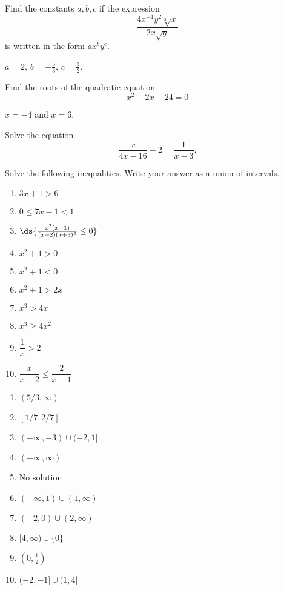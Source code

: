 \begin{enumialphparenastyle}
\begin{multicols}{2}
\begin{ex}
Find the constants $a,b,c$ if the expression
$$\frac{4x^{-1}y^2\sqrt[3]{x}}{2x\sqrt{y}}$$
is written in the form $ax^by^c$.
\begin{sol}
	$a=2$, $b=-\frac{5}{3}$, $c=\frac{3}{2}$. 
\end{sol}
\end{ex}

\begin{ex}
Find the roots of the quadratic equation
$$x^2-2x-24=0$$
\begin{sol}
$x=-4$ and $x=6$.
\end{sol}
\end{ex}

\begin{ex}
Solve the equation \\
$$\frac{x}{4x-16}-2=\frac{1}{x-3}.$$
\end{ex}


\begin{ex}
Solve the following inequalities. Write your answer as a union of intervals.
\begin{multicols}{2}
\begin{enumerate}
	\item	$3x+1>6$
	\item	$0\leq 7x-1 < 1$
	\item	$\ds{\frac{x^2(x-1)}{(x+2)(x+3)^3}\leq 0}$
	\item	$x^2+1>0$
	\item	$x^2+1<0$
	\item	$x^2+1>2x$
	\item	$x^3>4x$
	\item	$x^3\geq4x^2$
	\item	$\dfrac{1}{x}>2$
	\item	$\dfrac{x}{x+2}\leq\dfrac{2}{x-1}$
\end{enumerate}
\end{multicols}
\begin{sol}
\begin{enumerate}
	\item	$(5/3,\infty)$
	\item	$[1/7,2/7]$
	\item	$(-\infty,-3)\cup(-2,1]$
	\item	$(-\infty,\infty)$
	\item	No solution
	\item	$(-\infty,1)\cup(1,\infty)$
	\item	$(-2,0)\cup(2,\infty)$
	\item	$[4,\infty)\cup\{0\}$
	\item	$(0,\frac{1}{2})$
	\item	$(-2,-1]\cup(1,4]$
\end{enumerate}
\end{sol}
\end{ex}


\end{multicols}
\end{enumialphparenastyle}

